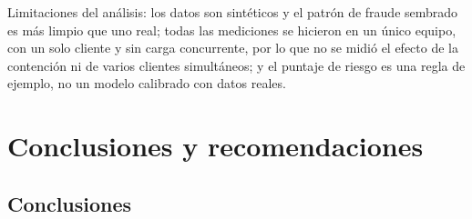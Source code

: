 \documentclass[11pt,a4paper]{article}
\begin{document}
	Limitaciones del análisis: los datos son sintéticos y el patrón de fraude sembrado es más limpio que uno real; todas las mediciones se hicieron en un único equipo, con un solo cliente y sin carga concurrente, por lo que no se midió el efecto de la contención ni de varios clientes simultáneos; y el puntaje de riesgo es una regla de ejemplo, no un modelo calibrado con datos reales.
	
	\section{Conclusiones y recomendaciones}
	
	\subsection{Conclusiones}
\end{document}
